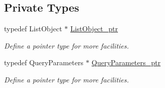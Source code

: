 \subsection*{Private Types}
\begin{DoxyCompactItemize}
\item 
\hypertarget{classQueryProxy_a2ed29ef6f2e7de15a59c3fc9e48dcd76}{
typedef ListObject $\ast$ \hyperlink{classQueryProxy_a2ed29ef6f2e7de15a59c3fc9e48dcd76}{ListObject\_\-ptr}}
\label{classQueryProxy_a2ed29ef6f2e7de15a59c3fc9e48dcd76}

\begin{DoxyCompactList}\small\item\em Define a pointer type for more facilities. \item\end{DoxyCompactList}\item 
\hypertarget{classQueryProxy_a92bffb52502dff5376c6f5760920866b}{
typedef QueryParameters $\ast$ \hyperlink{classQueryProxy_a92bffb52502dff5376c6f5760920866b}{QueryParameters\_\-ptr}}
\label{classQueryProxy_a92bffb52502dff5376c6f5760920866b}

\begin{DoxyCompactList}\small\item\em Define a pointer type for more facilities. \item\end{DoxyCompactList}\end{DoxyCompactItemize}
